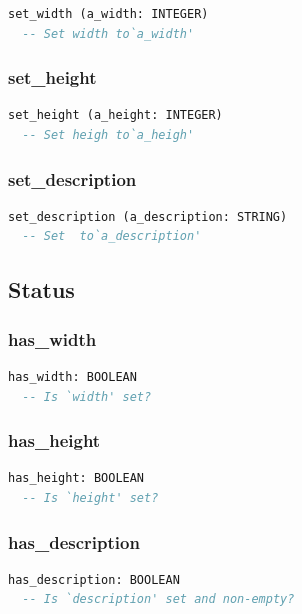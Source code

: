 \begin{lstlisting}[language=Eiffel]
set_width (a_width: INTEGER)
  -- Set width to`a_width'
\end{lstlisting}

\subsubsection{set\_height}

\begin{lstlisting}[language=Eiffel]
set_height (a_height: INTEGER)
  -- Set heigh to`a_heigh'
\end{lstlisting}

\subsubsection{set\_description}

\begin{lstlisting}[language=Eiffel]
set_description (a_description: STRING)
  -- Set  to`a_description'
\end{lstlisting}

\subsection{Status}
\label{sec:channel-image-status}

\subsubsection{has\_width}

\begin{lstlisting}[language=Eiffel]
has_width: BOOLEAN
  -- Is `width' set?
\end{lstlisting}

\subsubsection{has\_height}

\begin{lstlisting}[language=Eiffel]
has_height: BOOLEAN
  -- Is `height' set?
\end{lstlisting}

\subsubsection{has\_description}

\begin{lstlisting}[language=Eiffel]
has_description: BOOLEAN
  -- Is `description' set and non-empty?
\end{lstlisting}


